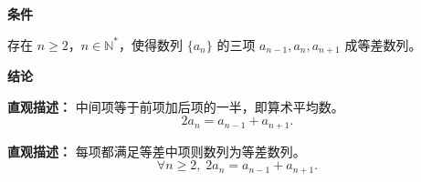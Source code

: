 \begin{statementbox}
	\textbf{\textcolor{CStatement}{条件}}
	\begin{description}[style=nextline, leftmargin=2.8em, labelsep=0.5em, itemsep=0.35em]
		\item[\textbf{\textcolor{CStatement}{条件 1（三项成等差）：}}]
			存在 $n\ge 2$，$n\in\mathbb{N}^{*}$，使得数列 $\{a_n\}$ 的三项 $a_{n-1},a_n,a_{n+1}$ 成等差数列。
	\end{description}
	\textbf{\textcolor{CStatement}{结论}}
	\begin{description}[style=nextline, leftmargin=2.8em, labelsep=0.5em, itemsep=0.45em]
		\item[\textbf{\textcolor{CStatement}{结论一（等差中项）：}}]
			\textbf{\textcolor{CStatement}{直观描述：}}
			中间项等于前项加后项的一半，即算术平均数。
			\[
				2a_n = a_{n-1} + a_{n+1}.
			\]
		\item[\textbf{\textcolor{CStatement}{常见变形（等差充要）：}}]
			\textbf{\textcolor{CStatement}{直观描述：}}
			每项都满足等差中项则数列为等差数列。
			\[
				\forall n\ge 2,\; 2a_n = a_{n-1}+a_{n+1}.
			\]
	\end{description}

\end{statementbox}
